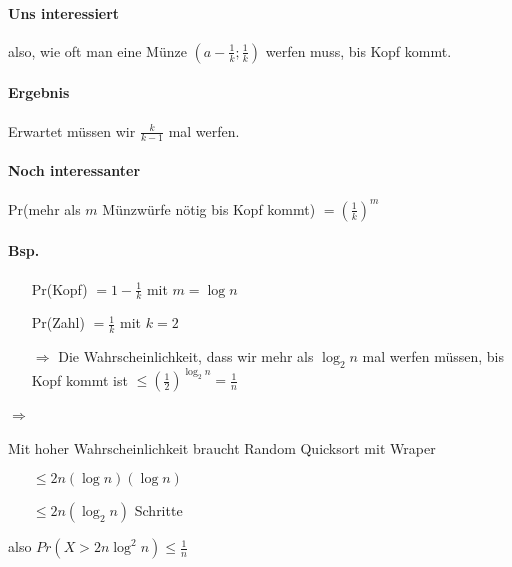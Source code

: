 
\paragraph*{Uns interessiert} also, wie oft man eine Münze $(a-\frac{1}{k};\frac{1}{k})$ werfen muss, bis Kopf kommt.

\paragraph*{Ergebnis} Erwartet müssen wir $\frac{k}{k-1}$ mal werfen.

\paragraph*{Noch interessanter} Pr(mehr als $m$ Münzwürfe nötig bis Kopf kommt) $= (\frac{1}{k})^m$

\paragraph*{Bsp.}
\begin{itemize}
	\item[] Pr(Kopf) $= 1 - \frac{1}{k}$ mit $m = \log n$ %
	\item[] Pr(Zahl) $= \frac{1}{k}$ mit $k=2$
	\item[$\Rightarrow$] Die Wahrscheinlichkeit, dass wir mehr als $\log_2 n$ mal werfen müssen, bis Kopf kommt ist $\leq (\frac{1}{2})^{\log_2 n} = \frac{1}{n}$
\end{itemize}

\paragraph*{$\Rightarrow$} Mit hoher Wahrscheinlichkeit braucht Random Quicksort mit Wraper
\begin{itemize}
	\item[] $\leq 2n (\log n)(\log n)$
	\item[] $\leq 2n (\log_2 n)$ Schritte
\end{itemize}
also $Pr(X > 2n \log^2 n)  \leq \frac{1}{n}$

